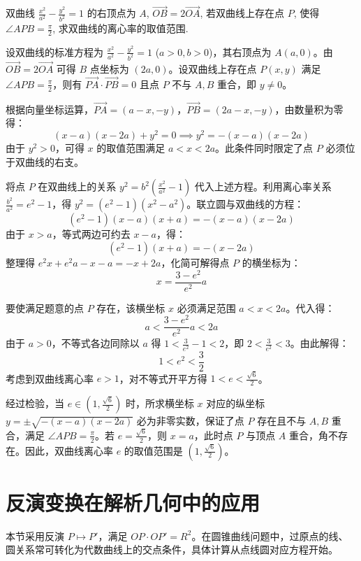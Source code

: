 \begin{example}[抹茶T5]
    双曲线 $\frac{x^{2}}{a^{2}} - \frac{y^{2}}{b^{2}} = 1$ 的右顶点为 $A$, $\overrightarrow{OB} = 2\overrightarrow{OA}$, 若双曲线上存在点 $P$, 使得 $\angle APB = \frac{\pi}{2}$, 求双曲线的离心率的取值范围.
\end{example}
\begin{solution}
设双曲线的标准方程为 $\frac{x^2}{a^2} - \frac{y^2}{b^2} = 1$ ($a>0, b>0$)，其右顶点为 $A(a, 0)$。由 $\overrightarrow{OB} = 2\overrightarrow{OA}$ 可得 $B$ 点坐标为 $(2a, 0)$。设双曲线上存在点 $P(x, y)$ 满足 $\angle APB = \frac{\pi}{2}$，则有 $\overrightarrow{PA} \cdot \overrightarrow{PB} = 0$ 且点 $P$ 不与 $A, B$ 重合，即 $y \neq 0$。

根据向量坐标运算，$\overrightarrow{PA} = (a - x, -y)$，$\overrightarrow{PB} = (2a - x, -y)$，由数量积为零得：
$$(x - a)(x - 2a) + y^2 = 0 \implies y^2 = -(x - a)(x - 2a)$$
由于 $y^2 > 0$，可得 $x$ 的取值范围满足 $a < x < 2a$。此条件同时限定了点 $P$ 必须位于双曲线的右支。

将点 $P$ 在双曲线上的关系 $y^2 = b^2 \left( \frac{x^2}{a^2} - 1 \right)$ 代入上述方程。利用离心率关系 $\frac{b^2}{a^2} = e^2 - 1$，得 $y^2 = (e^2 - 1)(x^2 - a^2)$。联立圆与双曲线的方程：
$$(e^2 - 1)(x - a)(x + a) = -(x - a)(x - 2a)$$
由于 $x > a$，等式两边可约去 $x - a$，得：
$$(e^2 - 1)(x + a) = -(x - 2a)$$
整理得 $e^2 x + e^2 a - x - a = -x + 2a$，化简可解得点 $P$ 的横坐标为：
$$x = \frac{3 - e^2}{e^2} a$$

要使满足题意的点 $P$ 存在，该横坐标 $x$ 必须满足范围 $a < x < 2a$。代入得：
$$a < \frac{3 - e^2}{e^2} a < 2a$$
由于 $a > 0$，不等式各边同除以 $a$ 得 $1 < \frac{3}{e^2} - 1 < 2$，即 $2 < \frac{3}{e^2} < 3$。由此解得：
$$1 < e^2 < \frac{3}{2}$$
考虑到双曲线离心率 $e > 1$，对不等式开平方得 $1 < e < \frac{\sqrt{6}}{2}$。

经过检验，当 $e \in (1, \frac{\sqrt{6}}{2})$ 时，所求横坐标 $x$ 对应的纵坐标 $y = \pm \sqrt{-(x-a)(x-2a)}$ 必为非零实数，保证了点 $P$ 存在且不与 $A, B$ 重合，满足 $\angle APB = \frac{\pi}{2}$。若 $e = \frac{\sqrt{6}}{2}$，则 $x = a$，此时点 $P$ 与顶点 $A$ 重合，角不存在。因此，双曲线离心率 $e$ 的取值范围是 $(1, \frac{\sqrt{6}}{2})$。
\end{solution}

\chapter{反演变换在解析几何中的应用}

本节采用反演 $P\mapsto P'$，满足 $OP\cdot OP'=R^2$。在圆锥曲线问题中，过原点的线、圆关系常可转化为代数曲线上的交点条件，具体计算从点线圆对应方程开始。

